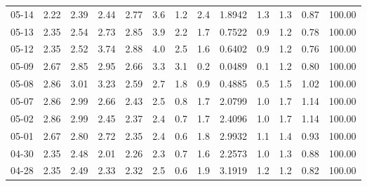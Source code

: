 \begin{threeparttable}
{\begin{tabular}{lrrrrrrrrrrrr}
  05-14 &          2.22 &          2.39 &          2.44 &        2.77 &                 3.6 &                 1.2 &        2.4 &       1.8942 &                 1.3 &              1.3 &            0.87 &                 100.00 \\
  05-13 &          2.35 &          2.54 &          2.73 &        2.85 &                 3.9 &                 2.2 &        1.7 &       0.7522 &                 0.9 &              1.2 &            0.78 &                 100.00 \\
  05-12 &          2.35 &          2.52 &          3.74 &        2.88 &                 4.0 &                 2.5 &        1.6 &       0.6402 &                 0.9 &              1.2 &            0.76 &                 100.00 \\
  05-09 &          2.67 &          2.85 &          2.95 &        2.66 &                 3.3 &                 3.1 &        0.2 &       0.0489 &                 0.1 &              1.2 &            0.80 &                 100.00 \\
  05-08 &          2.86 &          3.01 &          3.23 &        2.59 &                 2.7 &                 1.8 &        0.9 &       0.4885 &                 0.5 &              1.5 &            1.02 &                 100.00 \\
  05-07 &          2.86 &          2.99 &          2.66 &        2.43 &                 2.5 &                 0.8 &        1.7 &       2.0799 &                 1.0 &              1.7 &            1.14 &                 100.00 \\
  05-02 &          2.86 &          2.99 &          2.45 &        2.37 &                 2.4 &                 0.7 &        1.7 &       2.4096 &                 1.0 &              1.7 &            1.14 &                 100.00 \\
  05-01 &          2.67 &          2.80 &          2.72 &        2.35 &                 2.4 &                 0.6 &        1.8 &       2.9932 &                 1.1 &              1.4 &            0.93 &                 100.00 \\
  04-30 &          2.35 &          2.48 &          2.01 &        2.26 &                 2.3 &                 0.7 &        1.6 &       2.2573 &                 1.0 &              1.3 &            0.88 &                 100.00 \\
  04-28 &          2.35 &          2.49 &          2.33 &        2.32 &                 2.5 &                 0.6 &        1.9 &       3.1919 &                 1.2 &              1.2 &            0.82 &                 100.00 \\

\end{tabular}}
\end{threeparttable}

